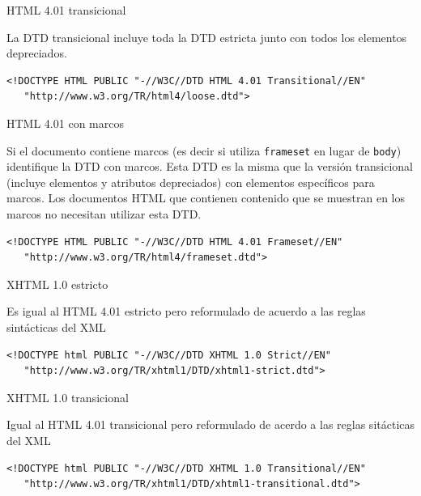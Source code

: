 \documentclass{beamer}
\begin{document}
\begin{frame}[fragile]{HTML 4.01 transicional} %
    \begin{center}
        La DTD transicional incluye toda la DTD estricta junto con todos los
        elementos depreciados. 
    \end{center}
    \begin{lstlisting}
<!DOCTYPE HTML PUBLIC "-//W3C//DTD HTML 4.01 Transitional//EN"
   "http://www.w3.org/TR/html4/loose.dtd">
    \end{lstlisting} 
\end{frame}

\begin{frame}[fragile]{HTML 4.01 con marcos} %
    \begin{center}
        Si el documento contiene marcos (es decir si utiliza \texttt{frameset}
        en lugar de \texttt{body}) identifique la DTD con marcos. Esta DTD es
        la misma que la versión transicional (incluye elementos y atributos
        depreciados) con elementos específicos para marcos. Los documentos HTML
        que contienen contenido que se muestran en los marcos no necesitan
        utilizar esta DTD.
    \end{center}
    \begin{lstlisting}
<!DOCTYPE HTML PUBLIC "-//W3C//DTD HTML 4.01 Frameset//EN"
   "http://www.w3.org/TR/html4/frameset.dtd">
    \end{lstlisting} 
\end{frame}

\begin{frame}[fragile]{XHTML 1.0 estricto} %
    \begin{center}
        Es igual al HTML 4.01 estricto pero reformulado de acuerdo a las reglas
        sintácticas del XML
    \end{center}
    \begin{lstlisting}
<!DOCTYPE html PUBLIC "-//W3C//DTD XHTML 1.0 Strict//EN"
   "http://www.w3.org/TR/xhtml1/DTD/xhtml1-strict.dtd">
    \end{lstlisting} 
\end{frame}

\begin{frame}[fragile]{XHTML 1.0 transicional} %
    \begin{center}
        Igual al HTML 4.01 transicional pero reformulado de acerdo a las reglas
        sitácticas del XML
    \end{center}
    \begin{lstlisting}
<!DOCTYPE html PUBLIC "-//W3C//DTD XHTML 1.0 Transitional//EN"
   "http://www.w3.org/TR/xhtml1/DTD/xhtml1-transitional.dtd">
    \end{lstlisting} 
\end{frame}
\end{document}
